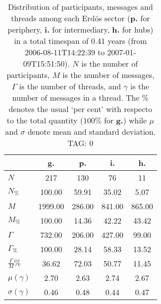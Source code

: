 \begin{table}[h!]
\begin{center}
\begin{tabular}{| l | c | c | c | c |}\hline
 & g. & p. & i. & h. \\\hline
$N$ & 217  & 130  & 76  & 11 \\\hline
$N_{\%}$ & 100.00  & 59.91  & 35.02  & 5.07 \\\hline
$M$ & 1999.00  & 286.00  & 841.00  & 865.00 \\\hline
$M_{\%}$ & 100.00  & 14.36  & 42.22  & 43.42 \\\hline
$\Gamma$ & 732.00  & 206.00  & 427.00  & 99.00 \\\hline
$\Gamma_{\%}$ & 100.00  & 28.14  & 58.33  & 13.52 \\\hline
$\frac{\Gamma}{M}\%$ & 36.62  & 72.03  & 50.77  & 11.45 \\\hline
$\mu(\gamma)$ & 2.70  & 2.63  & 2.74  & 2.67 \\\hline
$\sigma(\gamma)$ & 0.46  & 0.48  & 0.44  & 0.47 \\\hline
\end{tabular}
\caption{Distribution of participants, messages and threads among each Erd\"os sector ({\bf p.} for periphery, {\bf i.} for intermediary, 
    {\bf h.} for hubs) in a total timespan of 0.41 years (from 2006-08-11T14:22:39 to 2007-01-09T15:51:50). $N$ is the number of participants, $M$ is the number of messages, $\Gamma$ is the number of threads, and $\gamma$ is the number of messages in a thread.
    The \% denotes the usual `per cent' with respecto to the total quantity ($100\%$ for {\bf g.})
    while $\mu$ and $\sigma$ denote mean and standard deviation. TAG: 0}
\end{center}
\end{table}